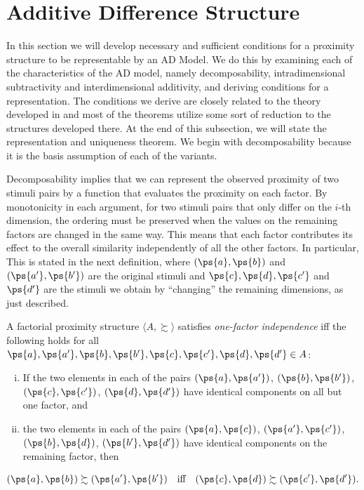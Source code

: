 \section{Additive Difference Structure} \label{sec-AD-ps}
In this section we will develop necessary and sufficient conditions for a proximity structure to be representable by an AD Model.
We do this by examining each of the characteristics of the AD model, namely decomposability, intradimensional subtractivity and interdimensional additivity, and deriving conditions for a representation. The conditions we derive are closely related to the theory developed in \textcite{foundations1} and most of the theorems utilize some sort of reduction to the structures developed there.
At the end of this subsection, we will state the representation and uniqueness theorem.
We begin with decomposability because it is the basis assumption of each of the variants.

Decomposability implies that we can represent the observed proximity of two stimuli pairs by a function that evaluates the proximity on each factor.
By monotonicity in each argument, for two stimuli pairs that only differ on the $i$-th dimension, the ordering must be preserved when the values on the remaining factors are changed in the same way.
This means that each factor contributes its effect to the overall similarity independently of all the other factors. In particular, This is stated in the next definition, where $(\ps{a}, \ps{b})$ and $(\ps{a'}, \ps{b'})$ are the original stimuli and $\ps{c}, \ps{d}, \ps{c'}$ and $\ps{d'}$ are the stimuli we obtain by ``changing'' the remaining dimensions, as just described.

\begin{ax} \label{def-onef-indep}
A factorial proximity structure $\langle A, \succsim \rangle$ satisfies \emph{one-factor independence} iff the following holds for all $\ps{a}, \ps{a'}, \ps{b}, \ps{b'}, \ps{c}, \ps{c'}, \ps{d}, \ps{d'} \in A$:
\begin{enumerate}[(i)]
  \item If the two elements in each of the pairs $(\ps{a}, \ps{a'})$, $(\ps{b}, \ps{b'})$, $(\ps{c}, \ps{c'})$, $(\ps{d}, \ps{d'})$ have identical components on all but one factor, and 
  \item the two elements in each of the pairs $(\ps{a}, \ps{c})$, $(\ps{a'}, \ps{c'})$, $(\ps{b}, \ps{d})$, $(\ps{b'}, \ps{d'})$ have identical components on the remaining factor, then  
\end{enumerate}
$$
(\ps{a}, \ps{b}) \succsim (\ps{a'}, \ps{b'}) \quad \text{iff} \quad (\ps{c}, \ps{d}) \succsim (\ps{c'}, \ps{d'}).
$$
\end{ax}

